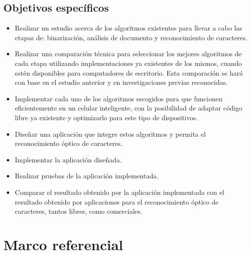 \documentclass[a4paper, 11pt, oneside]{article}
\begin{document}
	\subsection{Objetivos específicos}
	\begin{itemize}
	\item Realizar un estudio acerca de los algoritmos existentes para llevar a cabo las etapas de: binarización, análisis de documento y reconocimiento de caracteres.
	\item Realizar una comparación técnica para seleccionar los mejores algoritmos de cada etapa utilizando implementaciones ya existentes de los mismos, cuando estén disponibles para computadores de escritorio. Esta comparación se hará con base en el estudio anterior y en investigaciones previas reconocidas.
	\item Implementar cada uno de los algoritmos escogidos para que funcionen eficientemente en un celular inteligente, con la posibilidad de adaptar código libre ya existente y optimizarlo para este tipo de dispositivos.
	\item Diseñar una aplicación que integre estos algoritmos y permita el reconocimiento óptico de caracteres.
	\item Implementar la aplicación diseñada.
	\item Realizar pruebas de la aplicación implementada.
	\item Comparar el resultado obtenido por la aplicación implementada con el resultado obtenido por aplicaciones para el reconocimiento óptico de caracteres, tantos libres, como comerciales.
	\end{itemize}
	\clearpage
	
	\section{Marco referencial}
	
\end{document}
